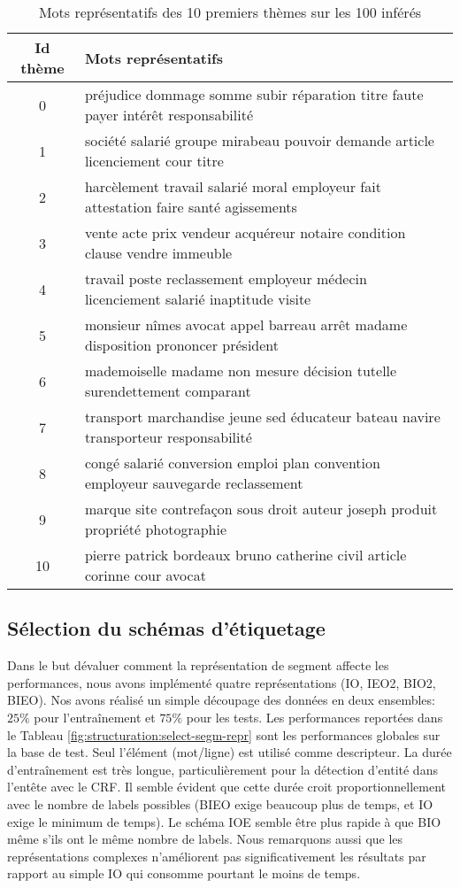 \begin{table}[!h]
\scriptsize
\begin{center}
\begin{tabular}{c|l}
Id thème & Mots représentatifs  \\ \hline
0	& 	préjudice  dommage  somme  subir  réparation  titre  faute  payer  intérêt  responsabilité  \\ \hline
1	& société  salarié  groupe  mirabeau  pouvoir  demande  article  licenciement  cour  titre    \\ \hline
2	& harcèlement  travail  salarié  moral  employeur  fait  attestation  faire  santé  agissements  \\ \hline
3	& vente  acte  prix  vendeur  acquéreur  notaire  condition  clause  vendre  immeuble  \\ \hline
4	& 		travail  poste  reclassement  employeur  médecin  licenciement  salarié  inaptitude  visite  \\ \hline
5	& 	monsieur  nîmes  avocat  appel  barreau  arrêt  madame  disposition  prononcer  président  \\ \hline
6	& 	mademoiselle  madame  non  mesure  décision  tutelle  surendettement  comparant   \\ \hline
7	& transport  marchandise  jeune  sed  éducateur  bateau  navire  transporteur  responsabilité  \\ \hline
8	&congé  salarié  conversion  emploi  plan  convention  employeur  sauvegarde  reclassement  \\ \hline
9	&marque  site  contrefaçon  sous  droit  auteur  joseph  produit  propriété  photographie  \\ \hline
10	&pierre  patrick  bordeaux  bruno  catherine  civil  article  corinne  cour  avocat\\ \hline
\end{tabular}
\end{center}
\caption{Mots représentatifs des 10 premiers thèmes sur les 100 inférés}\label{p4_topics}
\end{table}


\subsection{Sélection du schémas d'étiquetage}
Dans le but dévaluer comment la représentation de segment affecte les performances, nous avons implémenté quatre représentations (IO, IEO2, BIO2, BIEO).  Nos avons réalisé un simple découpage des données en deux ensembles: $25 \%$ pour l'entraînement et $75 \%$ pour les tests. Les performances reportées dans le Tableau \ref{fig:structuration:select-segm-repr} sont les performances globales sur la base de test. Seul l'élément (mot/ligne) est utilisé comme descripteur. La durée d'entraînement est très longue, particulièrement pour la détection d'entité dans l'entête avec le CRF. Il semble évident que cette durée croit proportionnellement avec le nombre de labels possibles (BIEO exige beaucoup plus de temps, et IO exige le minimum de temps). Le schéma IOE semble être plus rapide à que BIO même s'ils ont le même nombre de labels. Nous remarquons aussi que les représentations complexes n'améliorent pas significativement les résultats par rapport au simple IO qui consomme pourtant le moins de temps.

